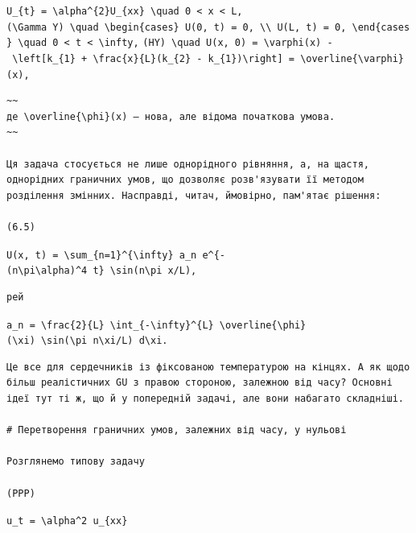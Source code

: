 \documentclass[
  ukrainian,
]{article}
\begin{document}
\texttt{U\_\{t\}\ =\ \textbackslash{}alpha\^{}\{2\}U\_\{xx\}\ \textbackslash{}quad\ 0\ \textless{}\ x\ \textless{}\ L,}
\texttt{(\textbackslash{}Gamma\ Y)\ \textbackslash{}quad\ \textbackslash{}begin\{cases\}\ U(0,\ t)\ =\ 0,\ \textbackslash{}\textbackslash{}\ U(L,\ t)\ =\ 0,\ \textbackslash{}end\{cases\}\ \textbackslash{}quad\ 0\ \textless{}\ t\ \textless{}\ \textbackslash{}infty,}
\texttt{(HY)\ \textbackslash{}quad\ U(x,\ 0)\ =\ \textbackslash{}varphi(x)\ -\ \textbackslash{}left{[}k\_\{1\}\ +\ \textbackslash{}frac\{x\}\{L\}(k\_\{2\}\ -\ k\_\{1\})\textbackslash{}right{]}\ =\ \textbackslash{}overline\{\textbackslash{}varphi\}(x),}

\begin{verbatim}
~~
де \overline{\phi}(x) — нова, але відома початкова умова.
~~

Ця задача стосується не лише однорідного рівняння, а, на щастя, однорідних граничних умов, що дозволяє розв'язувати її методом розділення змінних. Насправді, читач, ймовірно, пам'ятає рішення:

(6.5)
\end{verbatim}

\texttt{U(x,\ t)\ =\ \textbackslash{}sum\_\{n=1\}\^{}\{\textbackslash{}infty\}\ a\_n\ e\^{}\{-(n\textbackslash{}pi\textbackslash{}alpha)\^{}4\ t\}\ \textbackslash{}sin(n\textbackslash{}pi\ x/L),}

\begin{verbatim}
рей
\end{verbatim}

\texttt{a\_n\ =\ \textbackslash{}frac\{2\}\{L\}\ \textbackslash{}int\_\{-\textbackslash{}infty\}\^{}\{L\}\ \textbackslash{}overline\{\textbackslash{}phi\}(\textbackslash{}xi)\ \textbackslash{}sin(\textbackslash{}pi\ n\textbackslash{}xi/L)\ d\textbackslash{}xi.}

\begin{verbatim}
Це все для сердечників із фіксованою температурою на кінцях. А як щодо більш реалістичних GU з правою стороною, залежною від часу? Основні ідеї тут ті ж, що й у попередній задачі, але вони набагато складніші.

# Перетворення граничних умов, залежних від часу, у нульові

Розглянемо типову задачу

(PPP)
\end{verbatim}

\texttt{u\_t\ =\ \textbackslash{}alpha\^{}2\ u\_\{xx\}}
\end{document}
